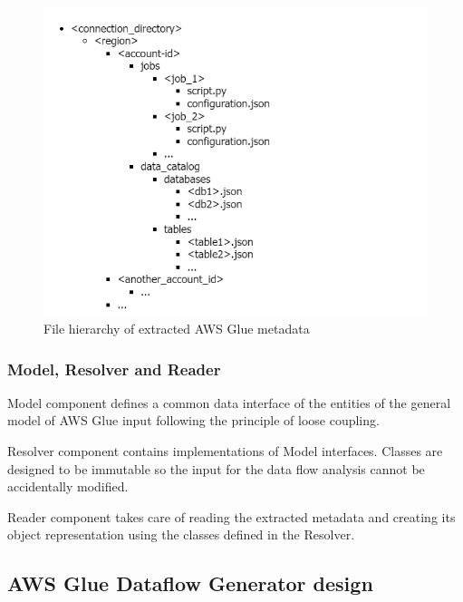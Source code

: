 \begin{figure}[ht]\centering
\includegraphics[width=1.0\textwidth]{img/file_hierarchy.png}
\caption{File hierarchy of extracted AWS Glue metadata}
\label{fig:hierarchy}
\end{figure}

\subsubsection{Model, Resolver and Reader}
Model component defines a common data interface of the entities of the general model of AWS Glue input following the principle of loose coupling.
\par
Resolver component contains implementations of Model interfaces. Classes are designed to be immutable so the input for the data flow analysis cannot be accidentally modified.
\par
Reader component takes care of reading the extracted metadata and creating its object representation using the classes defined in the Resolver.

\subsection{AWS Glue Dataflow Generator design}


